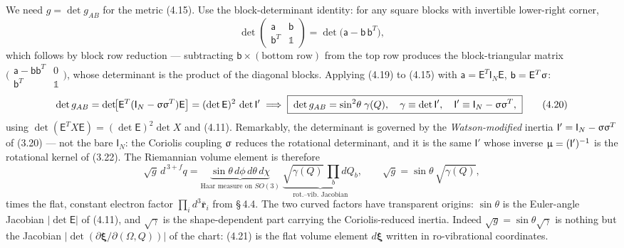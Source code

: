 We need $g=\det g_{AB}$ for the metric (4.15). Use the block-determinant identity: for any square blocks with invertible lower-right corner,
\begin{equation}
\det\!\begin{pmatrix}\mathsf a&\mathsf b\\ \mathsf b^{T}&\mathbb 1\end{pmatrix}
=\det\!\bigl(\mathsf a-\mathsf b\,\mathsf b^{T}\bigr), \tag{4.19}
\end{equation}
which follows by block row reduction --- subtracting $\mathsf b\times(\text{bottom row})$ from the top row produces the block-triangular matrix $\bigl(\begin{smallmatrix}\mathsf a-\mathsf b\mathsf b^{T}&0\\ \mathsf b^{T}&\mathbb 1\end{smallmatrix}\bigr)$, whose determinant is the product of the diagonal blocks. Applying (4.19) to (4.15) with $\mathsf a=\mathsf E^{T}\mathsf I_N\mathsf E$, $\mathsf b=\mathsf E^{T}\upsigma$:
\begin{equation}
\det g_{AB}
=\det\!\bigl[\mathsf E^{T}(\mathsf I_N-\upsigma\upsigma^{T})\mathsf E\bigr]
=(\det\mathsf E)^2\,\det\mathsf I'
\;\Longrightarrow\;
\boxed{\;\det g_{AB}=\sin^2\!\theta\;\gamma(Q),\quad
\gamma\equiv\det\mathsf I',\quad
\mathsf I'\equiv\mathsf I_N-\upsigma\upsigma^{T},\;}\tag{4.20}
\end{equation}
using $\det(\mathsf E^{T}X\mathsf E)=(\det\mathsf E)^2\det X$ and (4.11). Remarkably, the determinant is governed by the \emph{Watson-modified} inertia $\mathsf I'=\mathsf I_N-\upsigma\upsigma^{T}$ of (3.20) --- not the bare $\mathsf I_N$: the Coriolis coupling $\upsigma$ reduces the rotational determinant, and it is the same $\mathsf I'$ whose inverse $\upmu=(\mathsf I')^{-1}$ is the rotational kernel of (3.22). The Riemannian volume element is therefore
\begin{equation}
\boxed{\;
\sqrt{g}\,d^{\,3+f}q=\underbrace{\sin\theta\,d\phi\,d\theta\,d\chi}_{\text{Haar measure on }SO(3)}\;\underbrace{\sqrt{\gamma(Q)}\,\textstyle\prod_b dQ_b}_{\text{rot.--vib.\ Jacobian}},\qquad \sqrt{g}=\sin\theta\,\sqrt{\gamma(Q)},\;}\tag{4.21}
\end{equation}
times the flat, constant electron factor $\prod_id^3\bar{\mathbf r}_i$ from \S\,4.4. The two curved factors have transparent origins: $\sin\theta$ is the Euler-angle Jacobian $|\det\mathsf E|$ of (4.11), and $\sqrt\gamma$ is the shape-dependent part carrying the Coriolis-reduced inertia. Indeed $\sqrt g=\sin\theta\sqrt\gamma$ is nothing but the Jacobian $|\det(\partial\boldsymbol\xi/\partial(\Omega,Q))|$ of the chart: (4.21) is the flat volume element $d\boldsymbol\xi$ written in ro-vibrational coordinates.

